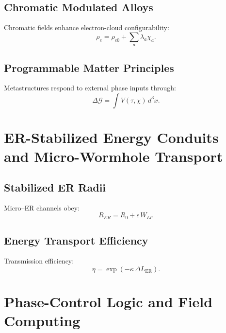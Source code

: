 \section{Chromatic Modulated Alloys}
Chromatic fields enhance electron-cloud configurability:
\[
\rho_e = \rho_{e0} + \sum_a \lambda_a \chi_a.
\]

\section{Programmable Matter Principles}
Metastructures respond to external phase inputs through:
\[
\Delta \mathcal{G} = \int V(\tau,\chi)\, d^3x.
\]



\chapter{ER-Stabilized Energy Conduits and Micro-Wormhole Transport}

\section{Stabilized ER Radii}
Micro–ER channels obey:
\[
R_{ER} = R_0 + \epsilon\, W_{IJ}.
\]

\section{Energy Transport Efficiency}
Transmission efficiency:
\[
\eta = \exp(-\kappa\, \Delta L_{\mathrm{ER}}).
\]



\chapter{Phase-Control Logic and Field Computing}

